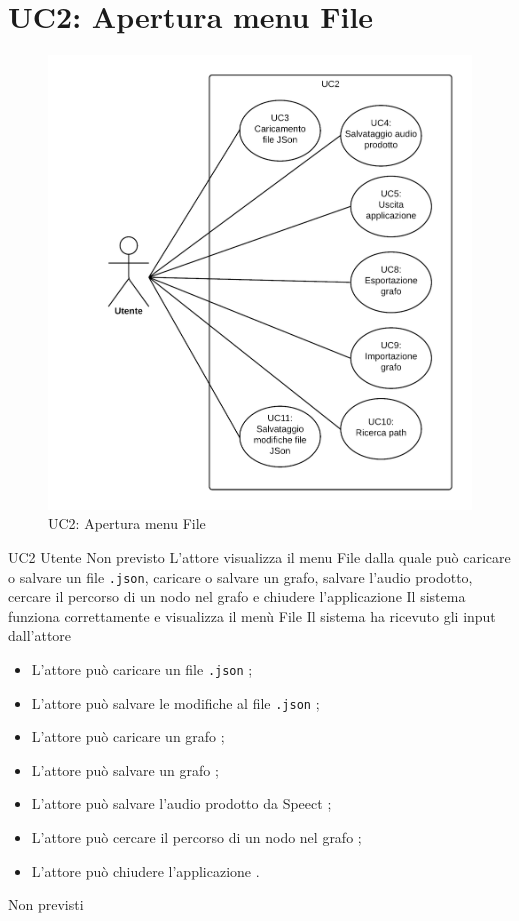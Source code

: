 \documentclass[../AnalisideiRequisiti.tex]{subfiles}
\begin{document}
	\section{UC2: Apertura menu File}
	\begin{figure}[H]
		
		\centering
		
		\includegraphics[width=\textwidth]{../img/UC2.png}
		
		\caption{UC2: Apertura menu File}
		
	\end{figure}
	\UserCase
	{UC2}
	{Utente}
	{Non previsto}
	{L'attore visualizza il menu File dalla quale può caricare o salvare un file \verb|.json|, caricare o salvare un grafo, salvare l'audio prodotto, cercare il percorso di un nodo nel grafo e chiudere l'applicazione}
	{Il sistema funziona correttamente e visualizza il menù File}
	{Il sistema ha ricevuto gli input dall'attore}
	{	\begin{itemize}
		\item{} L'attore può caricare un file \verb|.json| ;
		\item{} L'attore può salvare le modifiche al file \verb|.json| ;
		\item{} L'attore può caricare un grafo ;
		\item{} L'attore può salvare un grafo ;
		\item{} L'attore può salvare l'audio prodotto da Speect ;
		\item{} L'attore può cercare il percorso di un nodo nel grafo ;
		\item{} L'attore può chiudere l'applicazione .
		\end{itemize}
	}
	{Non previsti}
\end{document}

